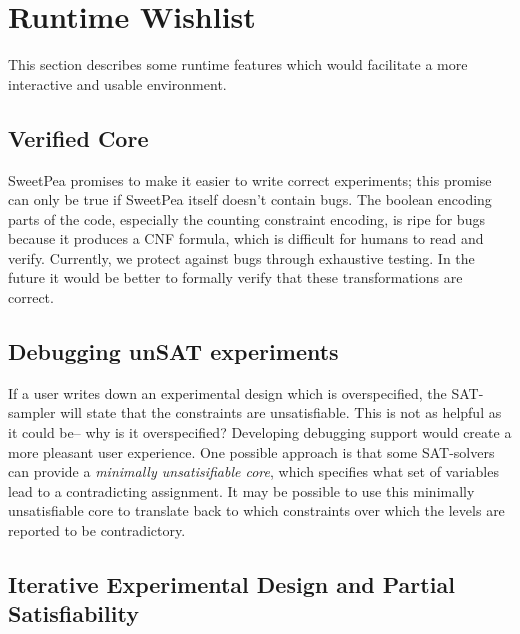 

\section{Runtime Wishlist}

This section describes some runtime features which would facilitate a more interactive and usable environment.


\subsection{Verified Core}

SweetPea promises to make it easier to write correct experiments; this promise can only be true if SweetPea itself doesn't contain bugs. The boolean encoding parts of the code, especially the counting constraint encoding, is ripe for bugs because it produces a CNF formula, which is difficult for humans to read and verify. Currently, we protect against bugs through exhaustive testing. In the future it would be better to formally verify that these transformations are correct.

\subsection{Debugging unSAT experiments}

If a user writes down an experimental design which is overspecified, the SAT-sampler will state that the constraints are unsatisfiable. This is not as helpful as it could be-- why is it overspecified? Developing debugging support would create a more pleasant user experience. One possible approach is that some SAT-solvers can provide a \emph{minimally unsatisifiable core}, which specifies what set of variables lead to a contradicting assignment. It may be possible to use this minimally unsatisfiable core to translate back to which constraints over which the levels are reported to be contradictory.

\subsection{Iterative Experimental Design and Partial Satisfiability}

